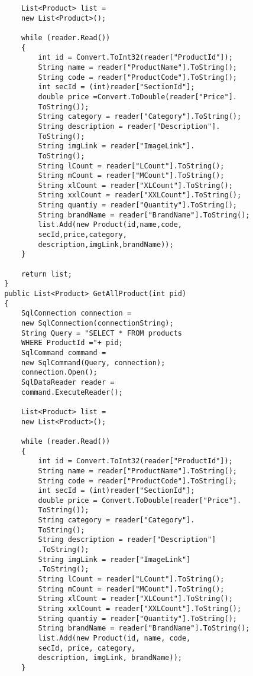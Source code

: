 \begin{lstlisting}
            List<Product> list =
            new List<Product>();

            while (reader.Read())
            {
                int id = Convert.ToInt32(reader["ProductId"]);
                String name = reader["ProductName"].ToString();
                String code = reader["ProductCode"].ToString();
                int secId = (int)reader["SectionId"];
                double price =Convert.ToDouble(reader["Price"].
                ToString());
                String category = reader["Category"].ToString();
                String description = reader["Description"].
                ToString();
                String imgLink = reader["ImageLink"].
                ToString();
                String lCount = reader["LCount"].ToString();
                String mCount = reader["MCount"].ToString();
                String xlCount = reader["XLCount"].ToString();
                String xxlCount = reader["XXLCount"].ToString();
                String quantiy = reader["Quantity"].ToString();
                String brandName = reader["BrandName"].ToString();
                list.Add(new Product(id,name,code,
                secId,price,category,
                description,imgLink,brandName));
            }

            return list;
        }
        public List<Product> GetAllProduct(int pid)
        {
            SqlConnection connection = 
            new SqlConnection(connectionString);
            String Query = "SELECT * FROM products 
            WHERE ProductId ="+ pid;
            SqlCommand command = 
            new SqlCommand(Query, connection);
            connection.Open();
            SqlDataReader reader = 
            command.ExecuteReader();

            List<Product> list = 
            new List<Product>();

            while (reader.Read())
            {
                int id = Convert.ToInt32(reader["ProductId"]);
                String name = reader["ProductName"].ToString();
                String code = reader["ProductCode"].ToString();
                int secId = (int)reader["SectionId"];
                double price = Convert.ToDouble(reader["Price"].
                ToString());
                String category = reader["Category"].
                ToString();
                String description = reader["Description"]
                .ToString();
                String imgLink = reader["ImageLink"]
                .ToString();
                String lCount = reader["LCount"].ToString();
                String mCount = reader["MCount"].ToString();
                String xlCount = reader["XLCount"].ToString();
                String xxlCount = reader["XXLCount"].ToString();
                String quantiy = reader["Quantity"].ToString();
                String brandName = reader["BrandName"].ToString();
                list.Add(new Product(id, name, code, 
                secId, price, category, 
                description, imgLink, brandName));
            }


\end{lstlisting}
